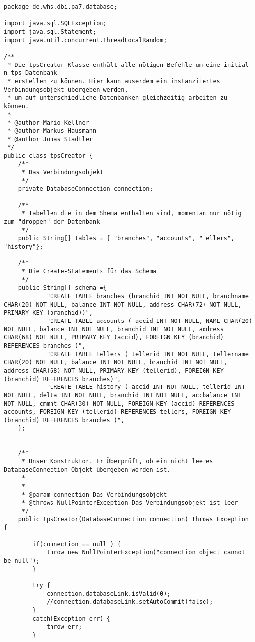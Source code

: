 \begin{lstlisting}[caption={tpsCreator}, label={lst:tpsv1}]
package de.whs.dbi.pa7.database;

import java.sql.SQLException;
import java.sql.Statement;
import java.util.concurrent.ThreadLocalRandom;

/**
 * Die tpsCreator Klasse enthält alle nötigen Befehle um eine initial n-tps-Datenbank
 * erstellen zu können. Hier kann auserdem ein instanziiertes Verbindungsobjekt übergeben werden,
 * um auf unterschiedliche Datenbanken gleichzeitig arbeiten zu können.
 * 
 * @author Mario Kellner
 * @author Markus Hausmann
 * @author Jonas Stadtler
 */
public class tpsCreator {
	/**
	 * Das Verbindungsobjekt
	 */
	private DatabaseConnection connection;
	
	/**
	 * Tabellen die in dem Shema enthalten sind, momentan nur nötig zum "droppen" der Datenbank
	 */
	public String[] tables = { "branches", "accounts", "tellers", "history"};
	
	/**
	 * Die Create-Statements für das Schema
	 */
	public String[] schema ={
			"CREATE TABLE branches (branchid INT NOT NULL, branchname CHAR(20) NOT NULL, balance INT NOT NULL, address CHAR(72) NOT NULL, PRIMARY KEY (branchid))",
			"CREATE TABLE accounts ( accid INT NOT NULL, NAME CHAR(20) NOT NULL, balance INT NOT NULL, branchid INT NOT NULL, address CHAR(68) NOT NULL, PRIMARY KEY (accid), FOREIGN KEY (branchid) REFERENCES branches )",
			"CREATE TABLE tellers ( tellerid INT NOT NULL, tellername CHAR(20) NOT NULL, balance INT NOT NULL, branchid INT NOT NULL, address CHAR(68) NOT NULL, PRIMARY KEY (tellerid), FOREIGN KEY (branchid) REFERENCES branches)",
			"CREATE TABLE history ( accid INT NOT NULL, tellerid INT NOT NULL, delta INT NOT NULL, branchid INT NOT NULL, accbalance INT NOT NULL, cmmnt CHAR(30) NOT NULL, FOREIGN KEY (accid) REFERENCES accounts, FOREIGN KEY (tellerid) REFERENCES tellers, FOREIGN KEY (branchid) REFERENCES branches )",
	};
	
	
	/**
	 * Unser Konstruktor. Er Überprüft, ob ein nicht leeres DatabaseConnection Objekt übergeben worden ist.
	 * 
	 * 
	 * @param connection Das Verbindungsobjekt
	 * @throws NullPointerException Das Verbindungsobjekt ist leer 
	 */
	public tpsCreator(DatabaseConnection connection) throws Exception {
		
		if(connection == null ) {
			throw new NullPointerException("connection object cannot be null");
		}
		
		try {
			connection.databaseLink.isValid(0);
			//connection.databaseLink.setAutoCommit(false);
		}
		catch(Exception err) {
			throw err;
		}
		

\end{lstlisting}
